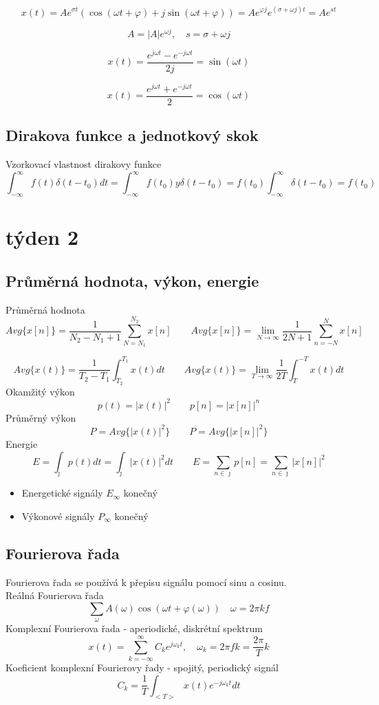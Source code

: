 \documentclass{article}
\begin{document}
		\[x(t) = Ae^{\sigma t}(\cos(\omega t+ \varphi) + j\sin(\omega t+ \varphi )) 
		= A e^{\varphi j}e^{(\sigma + \omega j)t}=Ae^{st}\]

		\[A = |A|e^{\omega j}, \quad s = \sigma + \omega j\]
		
		\[x(t) = \frac{e^{j\omega t} - e^{-j\omega t}}{2j} = \sin(\omega t)\]
		
		\[x(t) = \frac{e^{j\omega t} + e^{-j\omega t}}{2} = \cos(\omega t)\]
	\subsection*{Dirakova funkce a jednotkový skok}
	Vzorkovací vlastnost dirakovy funkce
		\[\int^{\infty}_{-\infty} f(t)\delta(t - t_0) dt 
		= \int^{\infty}_{-\infty} f(t_0)y\delta(t-t_0) 
		= f(t_0)\int^{\infty}_{-\infty} \delta(t - t_0) = f(t_0)\]

\section*{týden 2}
	\subsection*{Průměrná hodnota, výkon, energie}

		Průměrná hodnota
			\[Avg\{x[n]\} = \frac{1}{N_2-N_1+1} \sum^{N_2}_{N=N_1} x[n] 
			\qquad Avg\{x[n]\} = \lim_{N\to\infty}\frac{1}{2N+1}\sum_{n=-N}^{N}x[n]\]

			\[Avg\{x(t)\} = \frac{1}{T_2 - T_1}\int_{T_2}^{T_1}x(t)dt 
			\qquad Avg\{x(t)\} = \lim_{T\to\infty}\frac{1}{2T}\int_{T}^{-T}x(t)dt\]  
		Okamžitý výkon
			\[p(t) = |x(t)|^2 \qquad p[n] = |x[n]|^n\]
		Průměrný výkon
			\[P = Avg\{|x(t)|^2\} \qquad P = Avg\{|x[n]|^2\}\]
		Energie
			\[E = \int_\jmath p(t) dt = \int_\jmath |x(t)|^2 dt \qquad E 
			= \sum_{n\in\jmath} p[n] = \sum_{n\in\jmath}|x[n]|^2\]
	\begin{itemize}
		\item Energetické signály $E_{\infty}$ konečný
		\item Výkonové signály $P_{\infty}$ konečný
	\end{itemize}
	\subsection*{Fourierova řada}
	Fourierova řada se používá k přepisu signálu pomocí sinu a cosinu.\\
		Reálná Fourierova řada
			\[\sum_{\omega} A(\omega) \cos(\omega t + \varphi(\omega)) 
			\quad \omega = 2\pi k f\]
		Komplexní Fourierova řada - aperiodické, diskrétní spektrum
			\[x(t) = \sum_{k = -\infty}^\infty{C_k e^{j \omega_k t}}, 
			\quad \omega_k = 2 \pi fk = \frac{2 \pi}{T}k\]
		Koeficient komplexní Fourierovy řady - spojitý, periodický signál
			\[C_k = \frac{1}{T}\int_{<T>} x(t)e^{-j\omega_k t}dt\]
\end{document}
